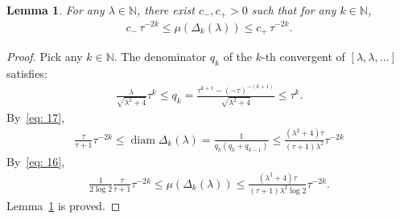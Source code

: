 \documentclass[10pt,a4paper]{amsart}
\newtheorem{lemma}{Lemma}
\begin{document}
\begin{lemma}\label{lem: assumption 2}
For any $\lambda\in\mathbb{N}$, there exist $c_-,c_+>0$ such that for any $k\in\mathbb{N}$,
\begin{align*}
    c_-\,\tau^{-2k}\leq \mu{(\Delta_k{(\lambda)})}\leq c_+\,\tau^{-2k}.
\end{align*}
\end{lemma}

\begin{proof}
Pick any $k\in\mathbb{N}$. The denominator $q_k$ of the $k$-th convergent of $[\lambda,\lambda,\ldots]$ satisfies:
\begin{align*}
    \frac{\lambda}{\sqrt{\lambda^2+4}}\tau^{k}\leq q_{k}=\frac{\tau^{k+1}-(-\tau)^{-(k+1)}}{\sqrt{\lambda^2+4}}\leq \tau^{k}.
\end{align*}
By~\eqref{eq: 17},
\begin{align*}
    \frac{\tau}{\tau+1} \tau^{-2k}
    \leq \operatorname{diam}{\Delta_k{(\lambda)}}
    =\frac{1}{q_k(q_k+q_{k-1})}
    \leq\frac{(\lambda^2+4)\tau}{(\tau+1)\lambda^2}\tau^{-2k}
\end{align*}
By~\eqref{eq: 16},
\begin{align*}
     \frac{1}{2\log{2}}\frac{\tau}{\tau+1}\tau^{-2k}\leq \mu{(\Delta_k{(\lambda)})}\leq \frac{(\lambda^2+4)\tau}{(\tau+1)\lambda^2\log{2}}\tau^{-2k}.
\end{align*}
Lemma~\ref{lem: assumption 2} is proved.
\end{proof}
\end{document}
